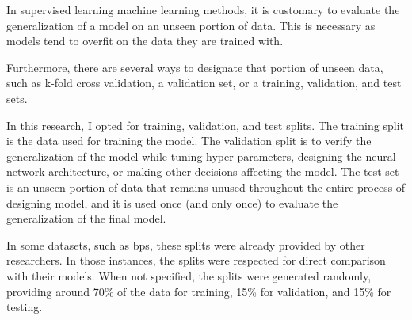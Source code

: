 
In supervised learning machine learning methods, it is
customary to evaluate the generalization of a model on an
unseen portion of data. This is necessary as models tend to
\gls{overfit} on the data they are trained with.

Furthermore, there are several ways to designate that
portion of unseen data, such as k-fold cross validation, a
validation set, or a training, validation, and test sets. 

In this research, I opted for training, validation, and test
splits. The training split is the data used for training the
model. The validation split is to verify the generalization
of the model while tuning hyper-parameters, designing the
neural network architecture, or making other decisions
affecting the model. The test set is an unseen portion of
data that remains unused throughout the entire process of
designing model, and it is used once (and only once) to
evaluate the generalization of the final model.

In some datasets, such as \gls{bps}, these splits were
already provided by other researchers. In those instances,
the splits were respected for direct comparison with their
models. When not specified, the splits were generated
randomly, providing around 70\% of the data for training,
15\% for validation, and 15\% for testing.